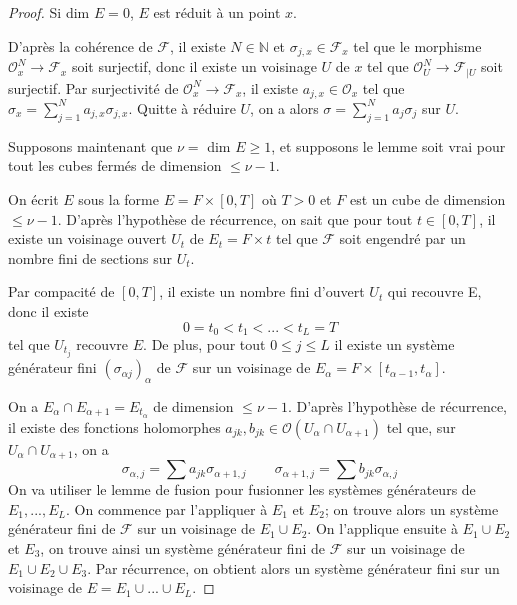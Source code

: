 \documentclass{article}
\theoremstyle{definition}
\theoremstyle{remark}
\begin{document}
\begin{proof}
Si dim $E = 0$, $E$ est réduit à un point $x$.

D'après la cohérence de $\mathcal{F}$, il existe $N \in \mathbb{N}$ et $\sigma_{j,x} \in \mathcal{F}_x$ tel que le morphisme $\mathcal{O}^N_x \to \mathcal{F}_x$ soit surjectif, donc il existe un voisinage $U$ de $x$ tel que $\mathcal{O}^N_U \to \mathcal{F}_{|U}$ soit surjectif.
Par surjectivité de $\mathcal{O}^N_x \to \mathcal{F}_x$, il existe $a_{j,x} \in \mathcal{O}_x$ tel que $\sigma_x = \sum_{j=1}^N a_{j,x}\sigma_{j,x}$. Quitte à réduire $U$, on a alors $\sigma = \sum_{j=1}^N a_j\sigma_j$ sur $U$.

Supposons maintenant que $\nu = $ dim $E \geq 1$, et supposons le lemme soit vrai pour tout les cubes fermés de dimension $\leq \nu - 1$.

On écrit $E$ sous la forme $E = F \times [0, T]$ où $T > 0$ et $F$ est un cube de dimension $\leq \nu - 1$. D'après l'hypothèse de récurrence, on sait que pour tout $t \in [0, T]$, il existe un voisinage ouvert $U_t$ de $E_t = F \times {t}$ tel que $\mathcal{F}$ soit engendré par un nombre fini de sections sur $U_t$.

Par compacité de $[0, T]$, il existe un nombre fini d'ouvert $U_t$ qui recouvre E, donc il existe $$0 = t_0 < t_1 < ... < t_L = T$$ tel que ${U_{t_j}}$ recouvre $E$. De plus, pour tout $0 \leq j \leq L$ il existe un système générateur fini $(\sigma_{\alpha j})_\alpha$ de $\mathcal{F}$ sur un voisinage de $E_\alpha = F \times [t_{\alpha - 1}, t_\alpha]$.

On a $E_\alpha \cap E_{\alpha+1} = E_{t_\alpha}$ de dimension $\leq \nu - 1$. D'après l'hypothèse de récurrence, il existe des fonctions holomorphes $a_{jk}, b_{jk} \in \mathcal{O}(U_\alpha \cap U_{\alpha +1})$ tel que, sur $U_\alpha \cap U_{\alpha +1}$, on a
\begin{equation*}
\sigma_{\alpha,j} = \sum a_{jk}\sigma_{\alpha+1,j} \qquad
\sigma_{\alpha+1,j} = \sum b_{jk}\sigma_{\alpha,j}
\end{equation*}
On va utiliser le lemme de fusion pour fusionner les systèmes générateurs de $E_1, ..., E_L$. On commence par l'appliquer à $E_1$ et $E_2$; on trouve alors un système générateur fini de $\mathcal{F}$ sur un voisinage de $E_1 \cup E_2$. On l'applique ensuite à $E_1 \cup E_2$ et $E_3$, on trouve ainsi un système générateur fini de $\mathcal{F}$ sur un voisinage de $E_1 \cup E_2 \cup E_3$. Par récurrence, on obtient alors un système générateur fini sur un voisinage de $E=E_1 \cup ... \cup E_L$.


\end{proof}
\end{document}
